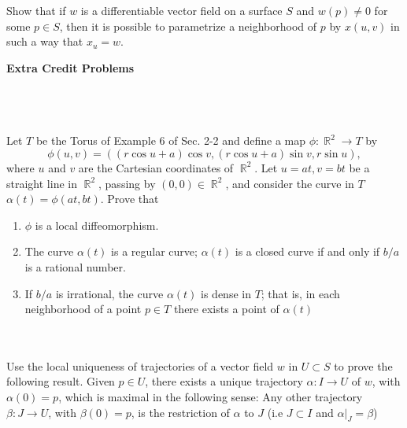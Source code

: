 \documentclass[12pt,letterpaper]{hmcpset}
\DeclareMathOperator{\R}{\mathbb{R}}
\begin{document}
\begin{problem}
\\ \\
Show that if $w$ is a differentiable vector field on a surface $S$ and $w(p)\neq 0$ for some $p\in S$, then it is possible to parametrize a neighborhood of $p$ by $x(u,v)$ in such a way that $x_u = w$. 
\end{problem}
\begin{solution}
\end{solution}

\newpage 
\textbf{Extra Credit Problems} \\
\\
\begin{problem}
\\ \\
Let $T$ be the Torus of Example 6 of Sec. 2-2 and define a map $\phi:\R^2\to T$ by 
$$\phi(u,v) = ((r\cos u+a)\cos v, (r\cos u + a)\sin v, r\sin u),$$
where $u$ and $v$ are the Cartesian coordinates of $\R^2$. Let $u=at, v=bt$ be a straight line in $\R^2$, passing by $(0,0) \in \R^2$, and consider the curve in $T$ $\alpha(t) = \phi(at,bt)$. Prove that 
\begin{enumerate}
    \item $\phi$ is a local diffeomorphism. 
    \item The curve $\alpha(t)$ is a regular curve; $\alpha(t)$ is a closed curve if and only if $b/a$ is a rational number.
    \item If $b/a$ is irrational, the curve $\alpha(t)$ is dense in $T$; that is, in each neighborhood of a point $p\in T$ there exists a point of $\alpha(t)$\\
\end{enumerate}
\end{problem}
\begin{solution}
\end{solution}

\begin{problem}
\\ \\
Use the local uniqueness of trajectories of a vector field $w$ in $U\subset S$ to prove the following result. Given $p\in U$, there exists a unique trajectory $\alpha:I\to U$ of $w$, with $\alpha(0) = p$, which is maximal in the following sense: Any other trajectory $\beta:J\to U$, with $\beta(0) = p$, is the restriction of $\alpha$ to $J$ (i.e $J\subset I$ and $\alpha|_J = \beta$)\\
\end{problem}
\begin{solution}
\end{solution}
\end{document}

